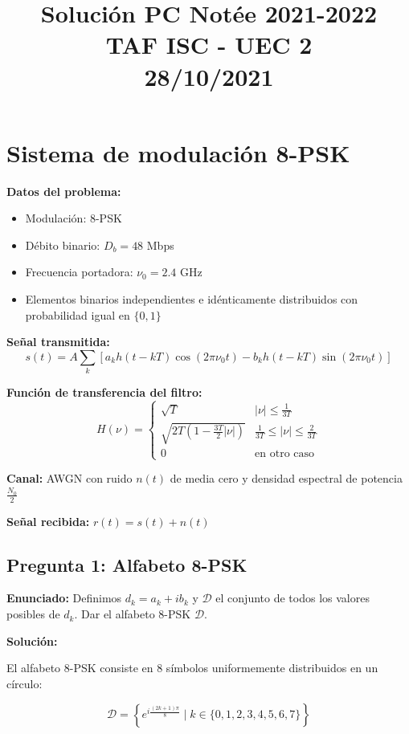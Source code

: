 \documentclass[11pt,a4paper]{article}
\title{\textbf{Soluci\'on PC Not\'ee 2021-2022\\TAF ISC - UEC 2\\28/10/2021}}
\author{}
\date{}
\begin{document}
\maketitle

\section*{Sistema de modulaci\'on 8-PSK}

\textbf{Datos del problema:}
\begin{itemize}
    \item Modulaci\'on: 8-PSK
    \item D\'ebito binario: $D_b = 48$ Mbps
    \item Frecuencia portadora: $\nu_0 = 2.4$ GHz
    \item Elementos binarios independientes e id\'enticamente distribuidos con probabilidad igual en $\{0,1\}$
\end{itemize}

\textbf{Se\~nal transmitida:}
\[
s(t) = A\sum_k \left[a_k h(t-kT)\cos(2\pi\nu_0 t) - b_k h(t-kT)\sin(2\pi\nu_0 t)\right]
\]

\textbf{Funci\'on de transferencia del filtro:}
\[
H(\nu) = \begin{cases}
\sqrt{T} & |\nu| \leq \frac{1}{3T} \\
\sqrt{2T\left(1 - \frac{3T}{2}|\nu|\right)} & \frac{1}{3T} \leq |\nu| \leq \frac{2}{3T} \\
0 & \text{en otro caso}
\end{cases}
\]

\textbf{Canal:} AWGN con ruido $n(t)$ de media cero y densidad espectral de potencia $\frac{N_0}{2}$

\textbf{Se\~nal recibida:} $r(t) = s(t) + n(t)$

\subsection*{Pregunta 1: Alfabeto 8-PSK}

\textbf{Enunciado:} Definimos $d_k = a_k + ib_k$ y $\mathcal{D}$ el conjunto de todos los valores posibles de $d_k$. Dar el alfabeto 8-PSK $\mathcal{D}$.

\vspace{0.3cm}
\textbf{Soluci\'on:}

El alfabeto 8-PSK consiste en 8 s\'imbolos uniformemente distribuidos en un c\'irculo:

\[
\boxed{\mathcal{D} = \left\{e^{i\frac{(2k+1)\pi}{8}} \mid k \in \{0, 1, 2, 3, 4, 5, 6, 7\}\right\}}
\]
\end{document}

